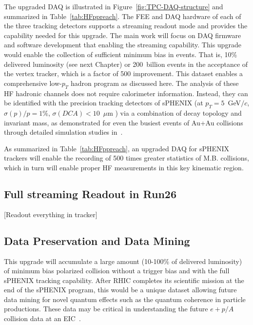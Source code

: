The upgraded DAQ is illustrated in Figure~\ref{fig:TPC-DAQ-structure} and
summarized in Table~\ref{tab:HFppreach}.  The FEE and DAQ hardware of
each of the three tracking detectors supports a streaming readout mode
and provides the capability needed for this upgrade. The main work
will focus on DAQ firmware and software development that enabling the
streaming capability.  This upgrade would enable the collection of
sufficient minimum bias in \pp events.  That is, 10\% delivered
luminosity (see next Chapter) or 200~billion events in the acceptance
of the vertex tracker, which is a factor of 500 improvement. This
dataset enables a comprehensive low-$p_T$ hadron program as discussed
here.  The analysis of these HF hadronic channels does not require
calorimeter information. Instead, they can be identified with the precision
tracking detectors of sPHENIX (at $p_T=5$~GeV$/c$, $\sigma(p)/p=1\%$,
$\sigma(DCA)<10$~$\mu$m ) via a combination of decay topology and
invariant mass, as demonstrated for even the busiest events of Au+Au
collisions through detailed simulation studies in~\cite{sPH-HF-2017-002}.

As summarized in Table~\ref{tab:HFppreach}, an upgraded DAQ for
sPHENIX trackers will enable the recording of 500 times greater
statistics of M.B. \pp collisions, which in turn will enable proper HF
measurements in this key kinematic region.

\subsection{Full streaming Readout in Run26}

[Readout everything in tracker]

\subsection{Data Preservation and Data Mining}

This upgrade will accumulate a large amount (10-100\% of delivered luminosity) 
of minimum
bias polarized \pp collision without a trigger bias and with the full
sPHENIX tracking capability. After RHIC completes its scientific
mission at the end of the sPHENIX program, this would be a unique
dataset allowing future data mining for novel quantum effects such as
the quantum coherence in particle productions. These \pp data may be
critical in understanding the future $e+p/A$ collision data at an
EIC~\cite{Accardi2012}.
